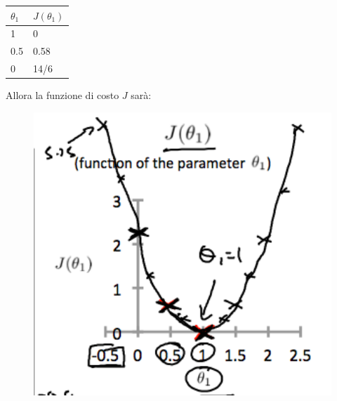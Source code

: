 \begin{esempio}
\begin{table}[h!]
\centering
\begin{tabular}{|l|l|}
\hline
{\color[HTML]{FE0000} \textit{$\theta_1$}} & {\color[HTML]{FE0000} \textit{$J(\theta_1)$}} \\ \hline
1                                          & 0                                    \\ \hline
0.5                                        & 0.58                                 \\ \hline
0                                          & 14/6                                 \\ \hline
\end{tabular}
\end{table}
Allora la funzione di costo $J$ sarà:
\begin{figure}[h!]
    \centering
    \includegraphics[width=1\textwidth]{img/fph0S5tTEeajtg5TyD0vYA_9b28bdfeb34b2d4914d0b64903735cf1_Screenshot-2016-10-26-01.09.05.png}
\end{figure}
\end{esempio}
